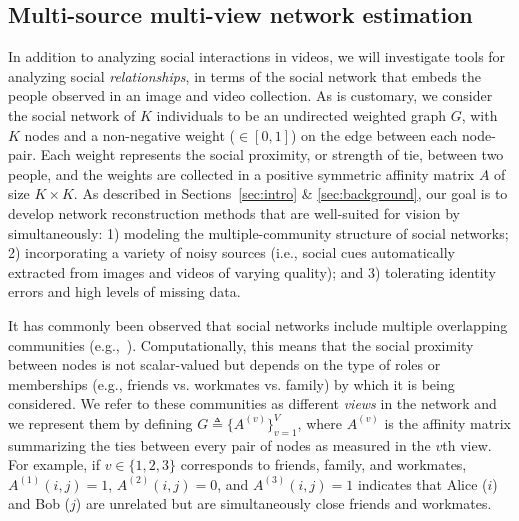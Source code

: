 
\subsection{Multi-source multi-view network estimation}
\label{sec:vis2net}

In addition to analyzing social interactions in videos, we will investigate tools for analyzing social \emph{relationships}, in terms of the social network that embeds the people observed in an image and video collection. As is customary, we consider the social network of $K$ individuals to be an undirected weighted graph $G$, with $K$ nodes and a non-negative weight ($\in [0,1]$) on the edge between each node-pair. Each  weight represents the social proximity, or strength of tie, between two people, and the weights are collected in a positive symmetric affinity matrix $A$ of size $K\times K$. As described in Sections~\ref{sec:intro} \& \ref{sec:background}, our goal is to develop network reconstruction methods that are well-suited for vision by simultaneously: 1) modeling the multiple-community structure of social networks; 2) incorporating a variety of noisy sources (i.e., social cues automatically extracted from images and videos of varying quality); and 3) tolerating identity errors and high levels of missing data.

It has commonly been observed that social networks include multiple overlapping communities (e.g.,~\cite{AiroldiBFX08,Kim12}). Computationally, this means that the social proximity between nodes is not scalar-valued but depends on the type of roles or memberships (e.g., friends vs. workmates vs. family) by which it is being considered. We refer to these communities as different \emph{views} in the network and we represent them by defining $G\triangleq\{A^{(v)}\}_{v=1}^{V}$, where $A^{(v)}$ is the affinity matrix summarizing the ties between every pair of nodes as measured in the $v$th view. For example, if $v\in\{1,2,3\}$ corresponds to friends, family, and workmates,  $A^{(1)}(i,j)=1$, $A^{(2)}(i,j)=0$, and $A^{(3)}(i,j)=1$ indicates that Alice ($i$) and Bob ($j$) are unrelated but are simultaneously close friends and workmates. 

